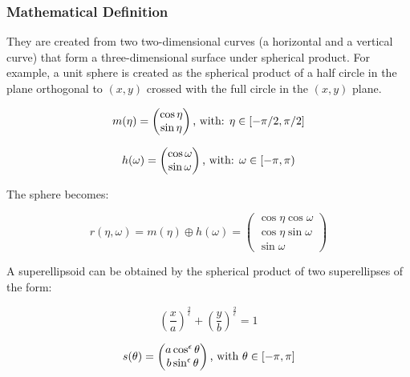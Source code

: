 \documentclass{article}
\begin{document}
\subsubsection*{Mathematical Definition}
\label{sec:math}
They are created from two two-dimensional curves (a horizontal and a vertical curve) that form a three-dimensional surface under spherical product. For example, a unit sphere is created as the spherical product of a half circle in the plane orthogonal to $(x, y)$ crossed with the full circle in the $(x, y)$ plane.

\begin{equation}
m (\eta) = \begin{pmatrix} \cos {\eta} \\ \sin{\eta} \end{pmatrix} \textnormal{, with: } \eta \in [-\pi/2, \pi/2] 
\end{equation}

\begin{equation}
h(\omega) = \begin{pmatrix} \cos {\omega} \\ \sin {\omega} \end{pmatrix} \textnormal{, with: } \omega \in [-\pi, \pi)
\end{equation}

The sphere becomes:

\begin{equation}
r (\eta, \omega) = m (\eta) \oplus h (\omega) = \begin{pmatrix} \cos{\eta} \cos{\omega} \\ \cos{\eta} \sin{\omega} \\ \sin{\omega} \end{pmatrix}
\end{equation}

A superellipsoid can be obtained by the spherical product of two superellipses of the form:

\begin{equation}
\left(\frac{x}{a}\right)^{\frac{2}{\epsilon}} + \left(\frac{y}{b}\right)^{\frac{2}{\epsilon}} = 1
\end{equation}

\begin{equation}
s(\theta) = \begin{pmatrix} a \cos^\epsilon{\theta} \\ b \sin^\epsilon {\theta} \end{pmatrix} \textnormal{, with } \theta \in [-\pi, \pi]
\end{equation}
\end{document}
